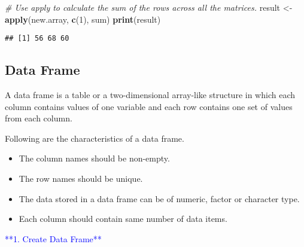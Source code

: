 \documentclass[
]{article}
\newenvironment{Shaded}{\begin{snugshade}}{\end{snugshade}}
\newcommand{\CommentTok}[1]{\textcolor[rgb]{0.56,0.35,0.01}{\textit{#1}}}
\newcommand{\DecValTok}[1]{\textcolor[rgb]{0.00,0.00,0.81}{#1}}
\newcommand{\FunctionTok}[1]{\textcolor[rgb]{0.13,0.29,0.53}{\textbf{#1}}}
\newcommand{\NormalTok}[1]{#1}
\newcommand{\OtherTok}[1]{\textcolor[rgb]{0.56,0.35,0.01}{#1}}
\providecommand{\tightlist}{%
  \setlength{\itemsep}{0pt}\setlength{\parskip}{0pt}}
\begin{document}
\begin{Shaded}
\begin{Highlighting}[]
\CommentTok{\# Use apply to calculate the sum of the rows across all the matrices.}
\NormalTok{result }\OtherTok{\textless{}{-}} \FunctionTok{apply}\NormalTok{(new.array, }\FunctionTok{c}\NormalTok{(}\DecValTok{1}\NormalTok{), sum)}
\FunctionTok{print}\NormalTok{(result)}
\end{Highlighting}
\end{Shaded}

\begin{verbatim}
## [1] 56 68 60
\end{verbatim}

\hypertarget{data-frame}{%
\subsection{Data Frame}\label{data-frame}}

A data frame is a table or a two-dimensional array-like structure in
which each column contains values of one variable and each row contains
one set of values from each column.

Following are the characteristics of a data frame.

\begin{itemize}
\tightlist
\item
  The column names should be non-empty.
\item
  The row names should be unique.
\item
  The data stored in a data frame can be of numeric, factor or character
  type.
\item
  Each column should contain same number of data items.
\end{itemize}

\textcolor{blue}{**1. Create Data Frame**}
\end{document}
